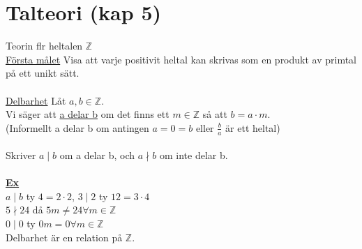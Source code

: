 \documentclass{article}
\begin{document}
    \section{Talteori (kap 5)}
    Teorin flr heltalen $\mathbb{Z}$\\
    \underline{Första målet} Visa att varje positivit heltal kan skrivas som en produkt av primtal på ett unikt sätt.\\\\
    \underline{Delbarhet} Låt $a,b\in \mathbb{Z}$.\\
    Vi säger att \underline{a delar b} om det finns ett $m\in \mathbb{Z}$ så att $b=a\cdot m$.\\
    (Informellt a delar b om antingen $a=0=b$ eller $\frac{b}{a}$ är ett heltal)
    \\\\
    Skriver $a\mid b$ om a delar b, och $a\nmid b$ om inte delar b.\\\\
    \underline{\textbf{Ex}}\\
    $a\mid b$ ty $4=2\cdot 2$, $3\mid 2$ ty $12=3\cdot 4$\\
    $5\nmid 24$ då $5m\neq 24 \forall m\in \mathbb{Z}$\\
    $0\mid 0$ ty $0m=0 \forall m\in \mathbb{Z}$\\
    Delbarhet är en relation på $\mathbb{Z}$.\\
\end{document}

